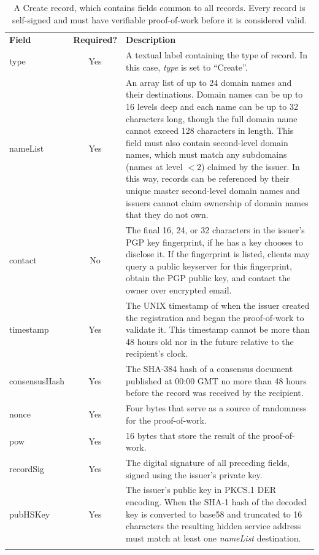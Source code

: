 \renewcommand{\arraystretch}{1.75} %
\begin{center}
    \begin{longtabu}{ | l | c | p{9.5cm} |}
    \hline
    \textbf{Field} & \textbf{Required?} & \textbf{Description} \\
    type & Yes & A textual label containing the type of record. In this case, \emph{type} is set to ``Create''. \\
    nameList & Yes & An array list of up to 24 domain names and their destinations.  Domain names can be up to 16 levels deep and each name can be up to 32 characters long, though the full domain name cannot exceed 128 characters in length. This field must also contain second-level domain names, which must match any subdomains (names at level $ < 2 $) claimed by the issuer. In this way, records can be referenced by their unique master second-level domain names and issuers cannot claim ownership of domain names that they do not own. \\
    contact & No & The final 16, 24, or 32 characters in the issuer's PGP key fingerprint, if he has a key chooses to disclose it. If the fingerprint is listed, clients may query a public keyserver for this fingerprint, obtain the PGP public key, and contact the owner over encrypted email. \\
	timestamp & Yes & The UNIX timestamp of when the issuer created the registration and began the proof-of-work to validate it. This timestamp cannot be more than 48 hours old nor in the future relative to the recipient's clock. \\
	consensusHash & Yes & The SHA-384 hash of a consensus document published at 00:00 GMT no more than 48 hours before the record was received by the recipient. \\
	nonce & Yes & Four bytes that serve as a source of randomness for the proof-of-work. \\
    pow & Yes & 16 bytes that store the result of the proof-of-work. \\
    recordSig & Yes & The digital signature of all preceding fields, signed using the issuer's private key. \\
    pubHSKey & Yes & The issuer's public key in PKCS.1 DER encoding. When the SHA-1 hash of the decoded key is converted to base58 and truncated to 16 characters the resulting hidden service address must match at least one \emph{nameList} destination.
    \\
    \hline
    \caption{A Create record, which contains fields common to all records. Every record is self-signed and must have verifiable proof-of-work before it is considered valid.}
    \end{longtabu}
	\label{table:createTable}
\end{center}

